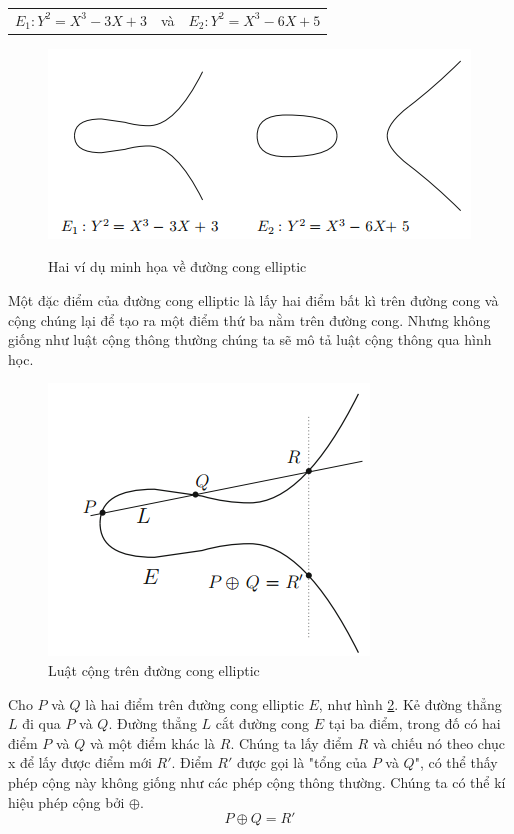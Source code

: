 \documentclass[a4paper,12pt]{report}
\newcounter{someCounter}
\begin{document}
\begin{center}
\begin{tabular}{ccc}
$E_1: Y^2 = X^3 - 3X + 3$ & và & $E_2: Y^2 = X^3 - 6X + 5$ 
\end{tabular}
\end{center}
\begin{figure}[h]
\begin{center}
\includegraphics[scale=0.95]{../im1.png} \label{h2.1}  
\caption{Hai ví dụ minh họa về đường cong elliptic}
\end{center}
\end{figure}
Một đặc điểm của đường cong elliptic là lấy hai điểm bất kì trên đường cong và cộng chúng lại để tạo ra một điểm thứ ba nằm trên đường cong. Nhưng không giống như luật cộng thông thường chúng ta sẽ mô tả luật cộng thông qua hình học.
\begin{figure}[h]
\begin{center}
\includegraphics[scale=1=0.95]{../im2.png}
\caption{Luật cộng trên đường cong elliptic}
\label{fig:h2.2}
\end{center}
\end{figure}

Cho $P$ và $Q$ là hai điểm trên đường cong elliptic $E$, như hình \ref{fig:h2.2}. Kẻ đường thẳng $L$ đi qua $P$ và $Q$. Đường thẳng $L$ cắt đường cong $E$ tại ba điểm, trong đố có hai điểm $P$ và $Q$ và một điểm khác là $R$. Chúng ta lấy điểm $R$ và chiếu nó theo chục x để lấy được điểm mới $R'$. Điểm $R'$ được gọi là "tổng của $P$ và $Q$", có thể thấy phép cộng này không giống như các phép cộng thông thường. Chúng ta có thể kí hiệu phép cộng bởi $\oplus$.
\begin{displaymath}
P \oplus Q = R'
\end{displaymath}
\end{document}
